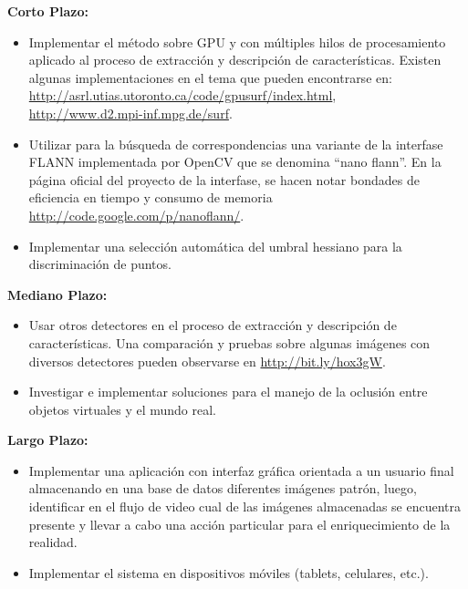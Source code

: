 \textbf{Corto Plazo:}
\begin{itemize}
 \item Implementar el método sobre GPU \cite{Terriberry_gpuaccelerating} y con múltiples hilos de procesamiento \cite{DBLP:journals/ijpp/Zhang10} aplicado al proceso de extracción y descripción de características. Existen algunas implementaciones en el tema que pueden encontrarse en: \url{http://asrl.utias.utoronto.ca/code/gpusurf/index.html},\\ \url{http://www.d2.mpi-inf.mpg.de/surf}.
 \item Utilizar para la búsqueda de correspondencias una variante de la interfase FLANN implementada por OpenCV que se denomina ``nano flann''. En la página oficial del proyecto de la interfase, se hacen notar bondades de eficiencia en tiempo y consumo de memoria \url{http://code.google.com/p/nanoflann/}.
 \item Implementar una selección automática del umbral hessiano para la discriminación de puntos.
\end{itemize}
\textbf{Mediano Plazo:}
\begin{itemize}
 \item Usar otros detectores en el proceso de extracción y descripción de características. Una comparación y pruebas sobre algunas imágenes con diversos detectores pueden observarse en \url{http://bit.ly/hox3gW}.
 \item Investigar e implementar soluciones para el manejo de la oclusión entre objetos virtuales y el mundo real.
\end{itemize}
\textbf{Largo Plazo:}
\begin{itemize}
 \item Implementar una aplicación con interfaz gráfica orientada a un usuario final almacenando en una base de datos diferentes imágenes patrón, luego, identificar en el flujo de video cual de las imágenes almacenadas se encuentra presente y llevar a cabo una acción particular para el enriquecimiento de la realidad.
 \item Implementar el sistema en dispositivos móviles (tablets, celulares, etc.).%
\end{itemize}
